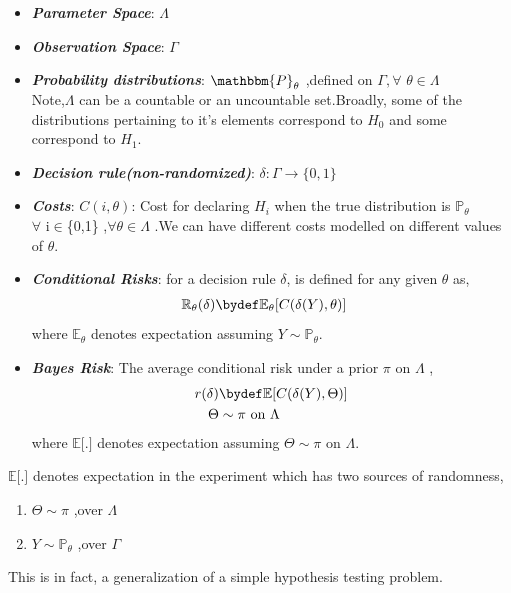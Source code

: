 \documentclass[12pt]{report}
\begin{document}
\begin{itemize}
\item {\bf \em Parameter Space}: $\Lambda$ 
\item {\bf \em Observation Space}: $\Gamma$
\item {\bf \em Probability distributions}:  $\mathbbm{P}_\theta$ ,defined on $\Gamma,\forall$ $\theta \in \Lambda$ 
\\Note,$\Lambda$ can be a countable or an uncountable set.Broadly, some of the distributions pertaining to it's elements correspond to $H_0$ and some correspond to $H_1$.
\item {\bf \em Decision rule(non-randomized)}:  $\delta: \Gamma \to \{0, 1\}$
\item {\bf \em Costs}:  $C(i,\theta)$: Cost for declaring $H_i$ when the true distribution is $\mathbb{P}_{\theta}$\\$\forall$ i$\in$\{0,1\} ,$\forall \theta\in\Lambda$ .We can have different costs modelled on different values of $\theta$.
\item {\bf \em Conditional Risks}: for a decision rule $\delta$, is defined for any given $\theta$ as, 
\begin{align*}
\mathbb R_\theta(\delta)&\bydef\mathbb{E}_{\theta}[C(\delta(Y),\theta)]
\end{align*}
where $\mathbb{E}_{\theta}$ denotes expectation assuming $Y\sim \mathbb{P}_{\theta}$.
\item {\bf \em Bayes Risk}: The average conditional risk under a prior $\pi$ on $\Lambda$ , 
\begin{align*}
r(\delta)&\bydef\mathbb{E}[C(\delta(Y),\Theta)]\\
\Theta&\sim\pi  \text{ on }  \Lambda
\end{align*}
where $\mathbb{E}\text{[.]}$ denotes expectation assuming $\Theta \sim\pi  \text{ on }  \Lambda$.
\end{itemize}


\begin{note}
$\mathbb{E}\text{[.]}$ denotes expectation in the experiment which has two sources of randomness,
\begin{enumerate}
\item $\Theta\sim\pi$ ,over $\Lambda$
\item $Y\sim\mathbb{P}_\theta$ ,over $\Gamma$
\end{enumerate}
This is in fact, a generalization of a simple hypothesis testing problem.
\end{note}
\end{document}
